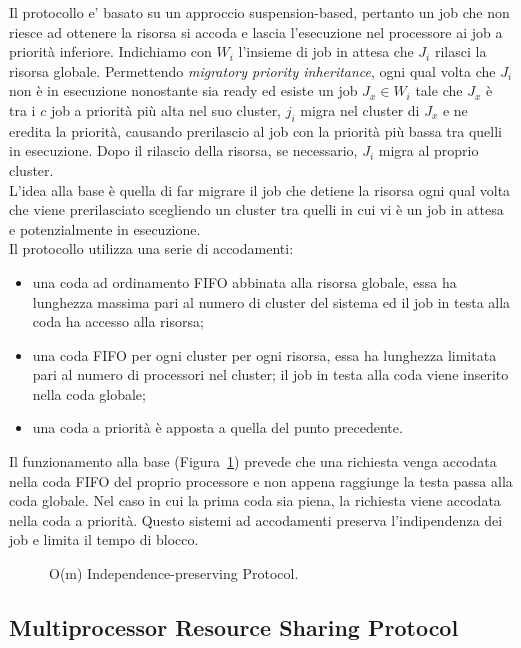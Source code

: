 Il protocollo e' basato su un approccio suspension-based, pertanto un job che non riesce ad ottenere la risorsa si accoda e lascia l’esecuzione nel processore ai job a priorità inferiore. Indichiamo con $W_i$ l'insieme di job in attesa che $J_i$ rilasci la risorsa globale. Permettendo \textit{migratory priority inheritance}, ogni qual volta che $J_i$ non è in esecuzione nonostante sia ready ed esiste un job $J_x \in W_i$ tale che $J_x$ è tra i $c$ job a priorità più alta nel suo cluster, $j_i$ migra nel cluster di $J_x$ e ne eredita la priorità, causando prerilascio al job con la priorità più bassa tra quelli in esecuzione. Dopo il rilascio della risorsa, se necessario, $J_i$ migra al proprio cluster.\\
L'idea alla base è quella di far migrare il job che detiene la risorsa ogni qual volta che viene prerilasciato scegliendo un cluster tra quelli in cui vi è un job in attesa e potenzialmente in esecuzione.\\

Il protocollo utilizza una serie di accodamenti:

\begin{itemize}
\item una coda ad ordinamento FIFO abbinata alla risorsa globale, essa ha lunghezza massima pari al numero di cluster del sistema ed il job in testa alla coda ha accesso alla risorsa;
\item una coda FIFO per ogni cluster per ogni risorsa, essa ha lunghezza limitata pari al numero di processori nel cluster; il job in testa alla coda viene inserito nella coda globale;
\item una coda a priorità è apposta a quella del punto precedente.
\end{itemize}

Il funzionamento alla base (Figura~\ref{fig:locks.omip}) prevede che una richiesta venga accodata nella coda FIFO del proprio processore e non appena raggiunge la testa passa alla coda globale. Nel caso in cui la prima coda sia piena, la richiesta viene accodata nella coda a priorità. Questo sistemi ad accodamenti preserva l'indipendenza dei job e limita il tempo di blocco.

\begin{figure}
\centering
{}
\caption{O(m) Independence-preserving Protocol.}
\label{fig:locks.omip}
\end{figure}

\subsection{Multiprocessor Resource Sharing Protocol}
\label{sec:lockProtocols.mrsp}

